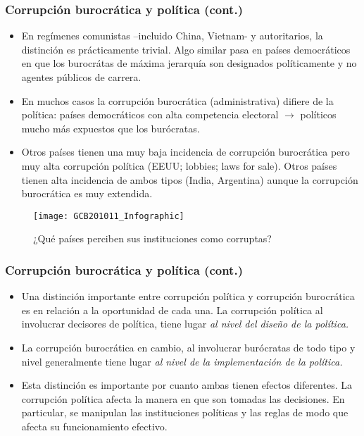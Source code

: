 \documentclass[handout,final,xcolor=dvipsnames]{beamer}
\begin{document}
\begin{frame}\frametitle{Corrupción burocrática y política (cont.)}
\begin{itemize}\itemsep 10pt
\item En regímenes comunistas --incluido China, Vietnam- y
  autoritarios, la distinción es prácticamente trivial. Algo similar
  pasa en países democráticos en que los burocrátas de máxima
  jerarquía son designados políticamente y no agentes públicos de
  carrera. 
\item En muchos casos la corrupción burocrática (administrativa)
  difiere de la política: países democráticos con
  alta competencia electoral $\longrightarrow$ políticos mucho
  más expuestos que los burócratas. 
\item Otros países tienen una muy baja incidencia de
  corrupción burocrática pero muy alta corrupción
  política (EEUU; lobbies; laws for sale). Otros países tienen
  alta incidencia de ambos tipos (India, Argentina) aunque la
  corrupción burocrática es muy extendida.  
\end{itemize}
\end{frame}


\begin{frame}
\begin{figure}[htbp]
    \centering
    \texttt{[image: GCB201011\_Infographic]}
    \caption{¿Qué países perciben sus instituciones como corruptas?}
    \label{fig:corruptinstit}
  \end{figure}
\end{frame}


\begin{frame}\frametitle{Corrupción burocrática y política (cont.)}
\begin{itemize}\itemsep 10pt
\item Una distinción importante entre corrupción política y corrupción
  burocrática es en relación a la oportunidad de cada una. La
  corrupción política al involucrar decisores de política, tiene lugar
  \textit{al nivel del diseño de la política.}
\item La corrupción burocrática en cambio, al involucrar burócratas de
  todo tipo y nivel generalmente tiene lugar \textit{al nivel de la
  implementación de la política.} 
\item Esta distinción es importante por cuanto ambas tienen efectos
  diferentes. La corrupción política afecta la manera en que son
  tomadas las decisiones. En particular, se manipulan las
  instituciones políticas y las reglas de modo que afecta su
  funcionamiento efectivo. 
\end{itemize}
\end{frame}
\end{document}
